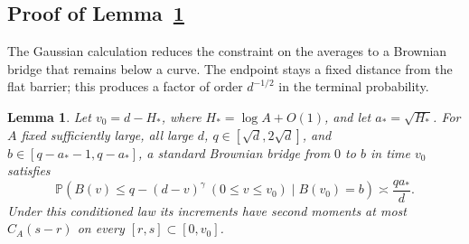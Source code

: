\documentclass[11pt,a4paper]{article}
\numberwithin{equation}{section}
\newtheorem{lemma}[theorem]{Lemma}
\theoremstyle{remark}
\begin{document}
\subsection{Proof of Lemma~\ref{lem:bridge}}\label{sec:bridge}
The Gaussian calculation reduces the constraint on the averages to a Brownian bridge that remains below a curve. The endpoint stays a fixed distance from the flat barrier; this produces a factor of order $d^{-1/2}$ in the terminal probability.
\begin{lemma}\label{lem:bridge}
Let $v_0=d-H_*$, where $H_*=\log A+O(1)$, and let $a_*=\sqrt{H_*}$.
For $A$ fixed sufficiently large, all large $d$, $q\in[\sqrt d,2\sqrt d]$, and
$b\in[q-a_*-1,q-a_*]$, a standard Brownian bridge from $0$ to $b$ in time $v_0$ satisfies
\begin{equation}\label{eq:7.12}
\mathbb P(B(v)\le q-(d-v)^\gamma\ (0\le v\le v_0)\mid B(v_0)=b)
\asymp\frac{qa_*}{d}.
\end{equation}
Under this conditioned law its increments have second moments at most
$C_A(s-r)$ on every $[r,s]\subset[0,v_0]$.
\end{lemma}
\end{document}
